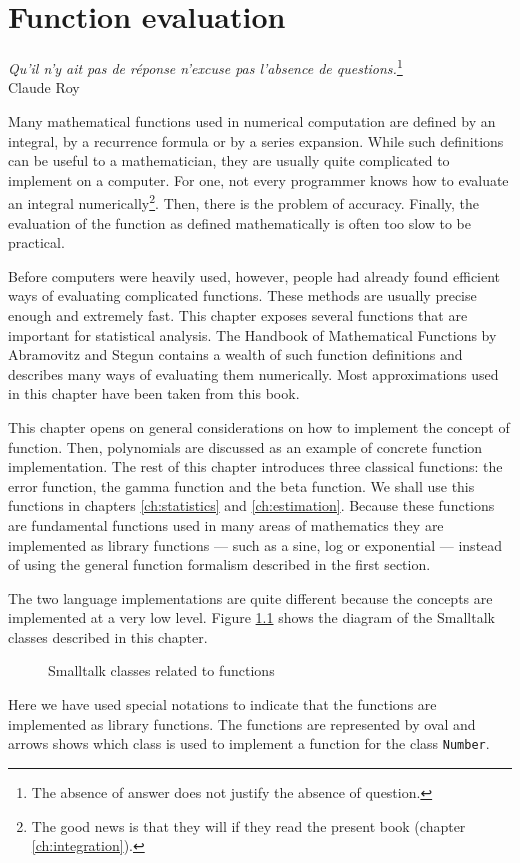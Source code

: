 \documentclass[twoside]{book}
\begin{document}
\fi

\chapter{Function evaluation}
\label{ch:function} \vspace{1 ex}
\begin{flushright}
{\sl Qu'il n'y ait pas de r\'eponse n'excuse pas l'absence de
questions.}\footnote{The absence of answer does not justify the
absence of question.}\\ Claude Roy
\end{flushright}
\vspace{1 ex} Many mathematical functions used in numerical
computation are defined by an integral, by a recurrence formula or
by a series expansion. While such definitions can be useful to a
mathematician, they are usually quite complicated to implement on
a computer. For one, not every programmer knows how to evaluate an
integral numerically\footnote{The good news is that they will if
they read the present book (\cf chapter \ref{ch:integration}).}.
Then, there is the problem of accuracy. Finally, the evaluation of
the function as defined mathematically is often too slow to be
practical.

Before computers were heavily used, however, people had already
found efficient ways of evaluating complicated functions. These
methods are usually precise enough and extremely fast. This
chapter exposes several functions that are important for
statistical analysis. The Handbook of Mathematical Functions by
Abramovitz and Stegun \cite{AbrSteg} contains a wealth of such
function definitions and describes many ways of evaluating them
numerically. Most approximations used in this chapter have been
taken from this book.

This chapter opens on general considerations on how to implement
the concept of function. Then, polynomials are discussed as an
example of concrete function implementation. The rest of this
chapter introduces three classical functions: the error function,
the gamma function and the beta function. We shall use this
functions in chapters \ref{ch:statistics} and \ref{ch:estimation}.
Because these functions are fundamental functions used in many
areas of mathematics they are implemented as library functions ---
such as a sine, log or exponential --- instead of using the
general function formalism described in the first section.

The two language implementations are quite different because the
concepts are implemented at a very low level. Figure
\ref{fig:functions} shows the diagram of the Smalltalk classes
described in this chapter.
\begin{figure}
\center{}
\caption{Smalltalk classes related to functions}
\label{fig:functions}
\end{figure}
Here we have used special notations to indicate that the functions
are implemented as library functions. The functions are
represented by oval and arrows shows which class is used to
implement a function for the class {\tt Number}.
\end{document}
